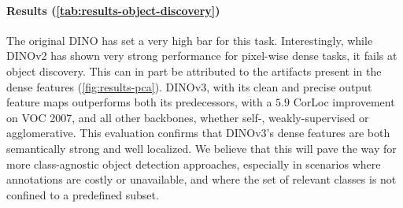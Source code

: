 \paragraph[Results]{Results (\cref{tab:results-object-discovery})}
The original DINO has set a very high bar for this task. 
Interestingly, while DINOv2 has shown very strong performance for pixel-wise dense tasks, it fails at object discovery.
This can in part be attributed to the artifacts present in the dense features (\cf \cref{fig:results-pca}).
DINOv3, with its clean and precise output feature maps outperforms both its predecessors, with a $5.9$ CorLoc improvement on VOC 2007, and all other backbones, whether self-, weakly-supervised or agglomerative.
This evaluation confirms that DINOv3's dense features are both semantically strong and well localized.
We believe that this will pave the way for more class-agnostic object detection approaches, especially in scenarios where annotations are costly or unavailable, and where the set of relevant classes is not confined to a predefined subset.

